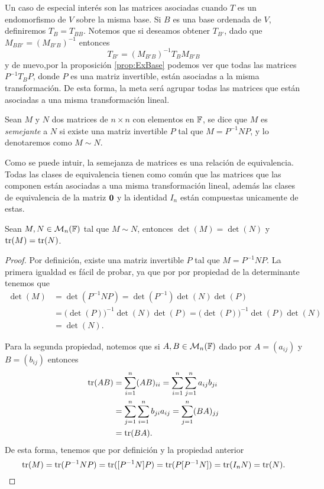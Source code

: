 Un caso de especial interés son las matrices asociadas cuando $T$ es un endomorfismo de $V$ sobre la misma base. Si $B$ es una base ordenada de $V$, definiremos $T_B = T_{BB}$. Notemos que si deseamos obtener $T_{B'}$, dado que $M_{BB'} = (M_{B'B})^{-1}$ entonces 
  \[ T_{B'} = (M_{B'B})^{-1} T_B M_{B'B} \]
y de nuevo,por la proposición \ref{prop:ExBase} podemos ver que todas las matrices $P^{-1}T_{B}P$, donde $P$ es una matriz invertible, están asociadas a la misma transformación. De esta forma, la meta será agrupar todas las matrices que están asociadas a una misma transformación lineal.

\begin{defi}
  Sean $M$ y $N$ dos matrices de $n \times n$ con elementos en $\mathbb{F}$, se dice que $M$ es \emph{semejante} a $N$ si existe una matriz invertible $P$ tal que $M = P^{-1}NP$, y lo denotaremos como $M \sim N$.
\end{defi}

Como se puede intuir, la semejanza de matrices es una relación de equivalencia. Todas las clases de equivalencia tienen como común que las matrices que las componen están asociadas a una misma transformación lineal, además las clases de equivalencia de la matriz $\mathbf{0}$ y la identidad $I_n$ están compuestas unicamente de estas. 

\begin{prop}
  Sean $M,N \in \mathcal{M}_n(\mathbb{F})$ tal que $M \sim N$, entonces $\det(M) = \det(N)$ y $\operatorname{tr}(M) = \operatorname{tr}(N)$.
\end{prop}
\begin{proof}
  Por definición, existe una matriz invertible $P$ tal que $M = P^{-1}NP$. La primera igualdad es fácil de probar, ya que por por propiedad de la determinante tenemos  que
  \begin{align*}
    \det(M) &= \det(P^{-1}NP) = \det(P^{-1})\det(N) \det(P)  \\
      &= \bigl(\det(P)\bigr)^{-1} \det(N) \det(P) = \bigl(\det(P)\bigr)^{-1}\det(P)\det(N)  \\
      &= \det(N).
  \end{align*}
  
  Para la segunda propiedad, notemos que si $A,B \in \mathcal{M}_n(\mathbb{F})$ dado por $A = (a_{ij})$ y $B = (b_{ij})$ entonces
  \begin{align*}
    \operatorname{tr}(AB) &= \sum_{i=1}^n (AB)_{ii} = \sum_{i=1}^n \sum_{j=1}^n a_{ij} b_{ji} \\
      &=  \sum_{j=1}^n \sum_{i=1}^n b_{ji} a_{ij} = \sum_{j=1}^n (BA)_{jj} \\
      &= \operatorname{tr}(BA).
  \end{align*}
  De esta forma, tenemos que por definición y la propiedad anterior
  \[ \operatorname{tr}(M) = \operatorname{tr}(P^{-1}NP) = \operatorname{tr}([P^{-1}N]P) = \operatorname{tr}(P[P^{-1}N]) = \operatorname{tr}(I_n N) = \operatorname{tr}(N). \]
\end{proof}

